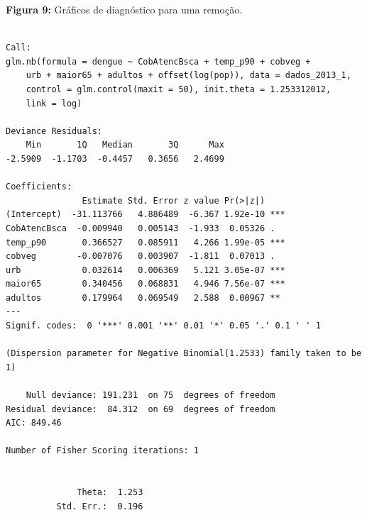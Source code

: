 \documentclass[12pt,a4paper]{article}\usepackage[]{graphicx}\usepackage[]{color}
\makeatletter
\newenvironment{kframe}{%
 \def\at@end@of@kframe{}%
 \ifinner\ifhmode%
  \def\at@end@of@kframe{\end{minipage}}%
  \begin{minipage}{\columnwidth}%
 \fi\fi%
 \def\FrameCommand##1{\hskip\@totalleftmargin \hskip-\fboxsep
 \colorbox{shadecolor}{##1}\hskip-\fboxsep
     \hskip-\linewidth \hskip-\@totalleftmargin \hskip\columnwidth}%
 \MakeFramed {\advance\hsize-\width
   \@totalleftmargin\z@ \linewidth\hsize
   \@setminipage}}%
 {\par\unskip\endMakeFramed%
 \at@end@of@kframe}
\newenvironment{knitrout}{}{} %
\makeatother
\begin{document}
\textbf{Figura 9:} Gráficos de diagnóstico para uma remoção.





\begin{knitrout}
\color{fgcolor}\begin{kframe}
\begin{verbatim}

Call:
glm.nb(formula = dengue ~ CobAtencBsca + temp_p90 + cobveg + 
    urb + maior65 + adultos + offset(log(pop)), data = dados_2013_1, 
    control = glm.control(maxit = 50), init.theta = 1.253312012, 
    link = log)

Deviance Residuals: 
    Min       1Q   Median       3Q      Max  
-2.5909  -1.1703  -0.4457   0.3656   2.4699  

Coefficients:
               Estimate Std. Error z value Pr(>|z|)    
(Intercept)  -31.113766   4.886489  -6.367 1.92e-10 ***
CobAtencBsca  -0.009940   0.005143  -1.933  0.05326 .  
temp_p90       0.366527   0.085911   4.266 1.99e-05 ***
cobveg        -0.007076   0.003907  -1.811  0.07013 .  
urb            0.032614   0.006369   5.121 3.05e-07 ***
maior65        0.340456   0.068831   4.946 7.56e-07 ***
adultos        0.179964   0.069549   2.588  0.00967 ** 
---
Signif. codes:  0 '***' 0.001 '**' 0.01 '*' 0.05 '.' 0.1 ' ' 1

(Dispersion parameter for Negative Binomial(1.2533) family taken to be 1)

    Null deviance: 191.231  on 75  degrees of freedom
Residual deviance:  84.312  on 69  degrees of freedom
AIC: 849.46

Number of Fisher Scoring iterations: 1


              Theta:  1.253 
          Std. Err.:  0.196 


\end{verbatim}
\end{kframe}
\end{knitrout}
\end{document}
